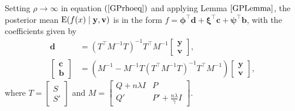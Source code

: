Setting $\rho \rightarrow \infty$ in equation $(\ref{GPrhoeq})$ and applying Lemma $\ref{GPLemma}$, the posterior mean $\mathrm{E} (f(x)\mid \mathbf{y},\mathbf{v})$ is in the form $f  = \mathbf{\phi}^\top \mathbf{d}+\mathbf{\xi}^\top \mathbf{c}+\mathbf{\psi}^\top \mathbf{b}$, with the coefficients given by
\begin{align*} 
\mathbf{d}&=\left(T^\top M^{-1}T\right)^{-1}T^\top M^{-1}\begin{bmatrix}\mathbf{y} \\ \mathbf{v} \end{bmatrix},\\
\begin{bmatrix}\mathbf{c}\\ \mathbf{b}\end{bmatrix} &=
\left(M^{-1}-M^{-1}T\left(T^\top M^{-1} T\right)^{-1}T^\top M^{-1}\right)\begin{bmatrix}\mathbf{y}\\ \mathbf{v} \end{bmatrix},
\end{align*} 
where $T=\begin{bmatrix} S\\S' \end{bmatrix}$ and $M=\begin{bmatrix} Q+n\lambda I& P\\
Q'& P'+\frac{n\lambda}{\gamma}I
\end{bmatrix}$.

